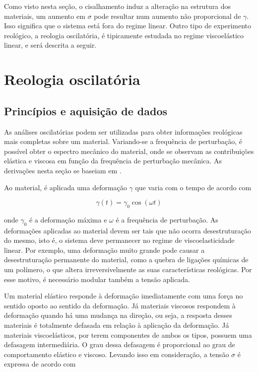 			Como visto nesta seção, o cisalhamento induz a alteração na estrutura dos materiais, um aumento em \(\sigma\) pode resultar num aumento não proporcional de \(\gamma\). Isso significa que o sistema está fora do regime linear. Outro tipo de experimento reológico, a reologia oscilatória, é tipicamente estudada no regime viscoelástico linear, e será descrita a seguir.\cite{Goodwin2008}
		\FloatBarrier

		\section{Reologia oscilatória} 
			\subsection{Princípios e aquisição de dados} 
			
			As análises oscilatórias podem ser utilizadas para obter informações reológicas mais completas sobre um material. Variando-se a frequência de perturbação, é possível obter o espectro mecânico do material, onde se observam as contribuições elástica e viscosa em função da frequência de perturbação mecânica.\cite{Goodwin2008} As derivações nesta seção se baseiam em \citeauthor{Lyklema_rheology}.
			
			Ao material, é aplicada uma deformação \(\gamma\) que varia com o tempo de acordo com
			
			\begin{equation}
				\gamma(t)=\gamma_0\cos(\omega t)
				\label{eqn:osc_gamma_t}
			\end{equation}
			
			\noindent onde \(\gamma_0\) é a deformação máxima e \(\omega\) é a frequência de perturbação. As deformações aplicadas ao material devem ser tais que não ocorra desestruturação do mesmo, isto é, o sistema deve permanecer no regime de viscoelasticidade linear. Por exemplo, uma deformação muito grande pode causar a desestruturação permanente do material, como a quebra de ligações químicas de um polímero, o que altera irreversivelmente as suas características reológicas. Por esse motivo, é necessário modular também a tensão aplicada.
			
			Um material elástico responde à deformação imediatamente com uma força no sentido oposto ao sentido da deformação. Já materiais viscosos respondem à deformação quando há uma mudança na direção, ou seja, a resposta desses materiais é totalmente defasada em relação à aplicação da deformação. Já materiais viscoelásticos, por terem componentes de ambos os tipos, possuem uma defasagem intermediária. O grau dessa defasagem é proporcional ao grau de comportamento elástico e viscoso. Levando isso em consideração, a tensão \(\sigma\)  é expressa de acordo com
			
